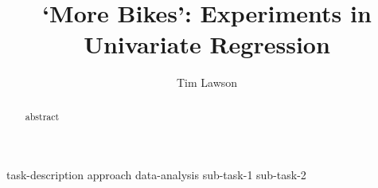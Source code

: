 \documentclass[11pt]{extarticle}
\begin{document}
\fancyhf{}
\fancyfoot[C]{\thepage}

\title{`More Bikes': Experiments in Univariate Regression}
\author[]{Tim Lawson}
\date{}

\maketitle

\begin{abstract}
  {abstract}
\end{abstract}

{task-description}
{approach}
{data-analysis}
{sub-task-1}
{sub-task-2}

\printbibliography
\end{document}
